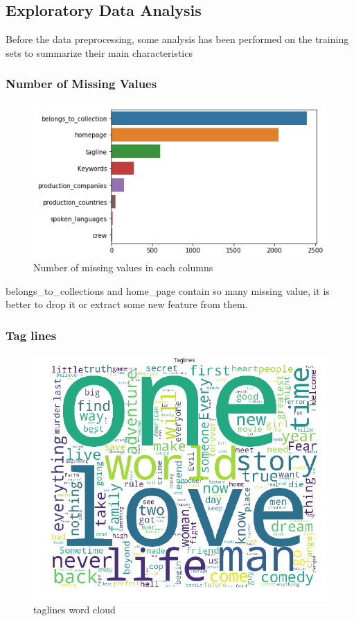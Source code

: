 \documentclass{article}
\begin{document}
\pagebreak

\subsection{Exploratory Data Analysis}
Before the data preprocessing, some analysis has been performed on the training sets to summarize their main characteristics


\subsubsection{Number of Missing Values}
\begin{figure}[h]
  \centering
  \includegraphics[scale=0.7]{collections.png}
  \caption{Number of missing values in each columns}
\end{figure}

belongs\_to\_collections and home\_page contain so many missing value, it is better to drop it or extract some new feature from them.

\subsubsection{Tag lines}
\begin{figure}[h]
  \centering
  \includegraphics[scale=0.5]{taglines.png}
  \caption{taglines word cloud}
\end{figure}
\end{document}
